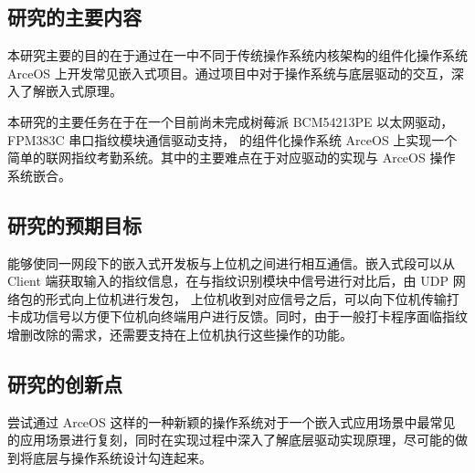 \subsection{研究的主要内容}

    本研究主要的目的在于通过在一中不同于传统操作系统内核架构的组件化操作系统 ArceOS 上开发常见嵌入式项目。通过项目中对于操作系统与底层驱动的交互，深入了解嵌入式原理。

    本研究的主要任务在于在一个目前尚未完成树莓派 BCM54213PE 以太网驱动，FPM383C 串口指纹模块通信驱动支持，
    的组件化操作系统 ArceOS 上实现一个简单的联网指纹考勤系统。其中的主要难点在于对应驱动的实现与 ArceOS 操作系统嵌合。

\subsection{研究的预期目标}

    能够使同一网段下的嵌入式开发板与上位机之间进行相互通信。嵌入式段可以从 Client 端获取输入的指纹信息，在与指纹识别模块中信号进行对比后，由 UDP 网络包的形式向上位机进行发包，
    上位机收到对应信号之后，可以向下位机传输打卡成功信号以方便下位机向终端用户进行反馈。同时，由于一般打卡程序面临指纹增删改除的需求，还需要支持在上位机执行这些操作的功能。

\subsection{研究的创新点}
    
    尝试通过 ArceOS 这样的一种新颖的操作系统对于一个嵌入式应用场景中最常见的应用场景进行复刻，同时在实现过程中深入了解底层驱动实现原理，尽可能的做到将底层与操作系统设计勾连起来。



